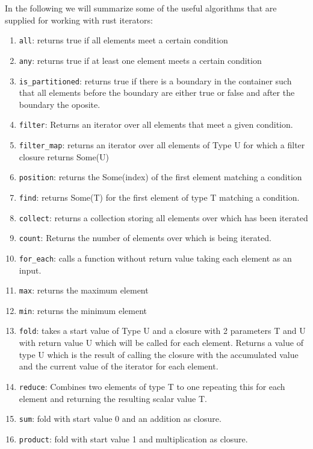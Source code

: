 In the following we will summarize some of the useful algorithms that are supplied for working with rust iterators:

\begin{enumerate}
    \item \lstinline{all}: returns true if all elements meet a certain condition
    \item \lstinline{any}: returns true if at least one element meets a certain condition
    \item \lstinline{is_partitioned}: returns true if there is a boundary in the container such that all elements before the boundary are either true or false and after the boundary the oposite.
    \item \lstinline{filter}: Returns an iterator over all elements that meet a given condition.
    \item \lstinline{filter_map}: returns an iterator over all elements of Type U for which a filter closure returns Some(U)
    \item \lstinline{position}: returns the Some(index) of the first element matching a condition
    \item \lstinline{find}: returns Some(T) for the first element of type T matching a condition.
    \item \lstinline{collect}: returns a collection storing all elements over which has been iterated
    \item \lstinline{count}: Returns the number of elements over which is being iterated.
    \item \lstinline{for_each}: calls a function without return value taking each element as an input.
    \item \lstinline{max}: returns the maximum element
    \item \lstinline{min}: returns the minimum element
    \item \lstinline{fold}: takes a start value of Type U and a closure with 2 parameters T and U with return value U which will be called for each element. Returns a value of type U which is the result of calling the closure with the accumulated value and the current value of the iterator for each element.
    \item \lstinline{reduce}: Combines two elements of type T to one repeating this for each element and returning the resulting scalar value T.
    \item \lstinline{sum}: fold with start value 0 and an addition as closure.
    \item \lstinline{product}: fold with start value 1 and multiplication as closure.

\end{enumerate}
